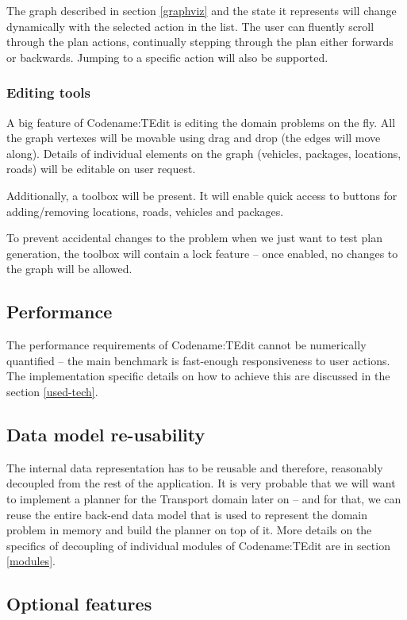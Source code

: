 \documentclass[10pt,a4paper,oneside]{article}
\newcommand{\pname}{Codename:TEdit } %
\begin{document}
The graph described in section \ref{graphviz} and the state it represents will change dynamically with the selected action in the list. The user can fluently scroll through the plan actions, continually stepping through the plan either forwards or backwards.
Jumping to a specific action will also be supported.

\subsubsection{Editing tools}

A big feature of \pname is editing the domain problems on the fly.
All the graph vertexes will be movable using drag and drop (the edges will move along).
Details of individual elements on the graph (vehicles, packages, locations, roads) will be editable
on user request.

Additionally, a toolbox will be present. It will enable quick access to buttons for adding/removing locations, roads, vehicles and packages.

To prevent accidental changes to the problem when we just want to test plan generation,
the toolbox will contain a lock feature -- once enabled, no changes to the graph will be allowed.

\subsection{Performance}

The performance requirements of \pname cannot be numerically quantified -- the main benchmark is fast-enough
responsiveness to user actions. The implementation specific details on how to achieve this are discussed in the section \ref{used-tech}.

\subsection{Data model re-usability}

The internal data representation has to be reusable and therefore, reasonably decoupled from the rest of the application.
It is very probable that we will want to implement a planner for the Transport domain later on
-- and for that, we can reuse the entire back-end data model that is used to represent the domain problem in memory
and build the planner on top of it.
More details on the specifics of decoupling of individual modules of \pname are in section \ref{modules}.

\subsection{Optional features}
\end{document}
